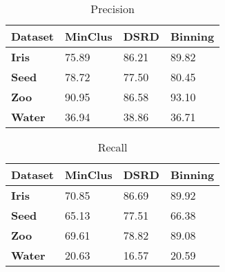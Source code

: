 \begin{table}[H]
\caption{Precision} 
\begin{center}
		\begin{tabular}{ | l | l | l | l |}
				\hline

				\textbf{Dataset} & \textbf{MinClus} & \textbf{DSRD} & \textbf{Binning} \\ \hline

                \textbf{Iris} & 75.89 & 86.21 & 89.82 \\ \hline
                \textbf{Seed} & 78.72 & 77.50 & 80.45 \\ \hline
                \textbf{Zoo}  & 90.95 & 86.58 & 93.10 \\ \hline
                \textbf{Water}& 36.94 & 38.86 & 36.71 \\ \hline
		\end{tabular}
\end{center}
\label{table:pre2}
\end{table}

\begin{table}[H]
\caption{Recall} 
\begin{center}
		\begin{tabular}{ | l | l | l | l |}
				\hline

				\textbf{Dataset} & \textbf{MinClus} & \textbf{DSRD} & \textbf{Binning} \\ \hline

                \textbf{Iris}  & 70.85 & 86.69 & 89.92 \\ \hline
                \textbf{Seed}  & 65.13 & 77.51 & 66.38 \\ \hline
                \textbf{Zoo}   & 69.61 & 78.82 & 89.08 \\ \hline
                \textbf{Water} & 20.63 & 16.57 & 20.59 \\ \hline
		\end{tabular}
\end{center}
\label{table:rec2}
\end{table}

